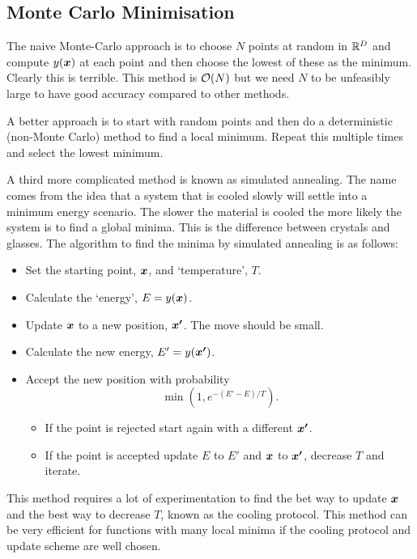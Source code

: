 \documentclass[a4paper]{article}
\begin{document}
    \subsection{Monte Carlo Minimisation}
    The naive Monte-Carlo approach is to choose \(N\) points at random in \(\mathbb{R}^D\) and compute \(y(\bm{x})\) at each point and then choose the lowest of these as the minimum.
    Clearly this is terrible.
    This method is \(\order{N}\) but we need \(N\) to be unfeasibly large to have good accuracy compared to other methods.
    
    A better approach is to start with random points and then do a deterministic (non-Monte Carlo) method to find a local minimum.
    Repeat this multiple times and select the lowest minimum.
    
    A third more complicated method is known as simulated annealing.
    The name comes from the idea that a system that is cooled slowly will settle into a minimum energy scenario.
    The slower the material is cooled the more likely the system is to find a global minima.
    This is the difference between crystals and glasses.
    The algorithm to find the minima by simulated annealing is as follows:
    \begin{itemize}
        \item Set the starting point, \(\bm{x}\), and `temperature', \(T\).
        \item Calculate the `energy', \(E = y(\bm{x})\).
        \item Update \(\bm{x}\) to a new position, \(\bm{x'}\).
        The move should be small.
        \item Calculate the new energy, \(E' = y(\bm{x'})\).
        \item Accept the new position with probability
        \[\min\left(1, e^{-(E' - E)/T}\right).\]
        \begin{itemize}
            \item If the point is rejected start again with a different \(\bm{x'}\).
            \item If the point is accepted update \(E\) to \(E'\) and \(\bm{x}\) to \(\bm{x'}\), decrease \(T\) and iterate.
        \end{itemize}
    \end{itemize}
    This method requires a lot of experimentation to find the bet way to update \(\bm{x}\) and the best way to decrease \(T\), known as the cooling protocol.
    This method can be very efficient for functions with many local minima if the cooling protocol and update scheme are well chosen.
    
\end{document}
